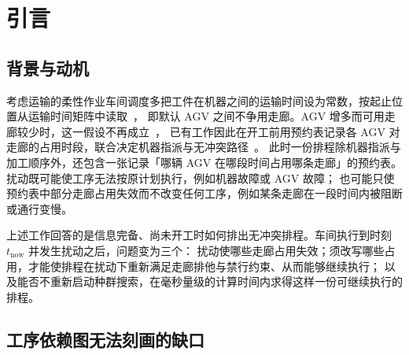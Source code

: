 \documentclass[manuscript,screen,review]{acmart}
\begin{document}


\maketitle

\section{引言}
\label{sec:introduction}

\subsection{背景与动机}

考虑运输的柔性作业车间调度多把工件在机器之间的运输时间设为常数，按起止位置从运输时间矩阵中读取~\cite{xin2025review,meng2025cp,qin2026knowledge}，
即默认 AGV 之间不争用走廊。AGV 增多而可用走廊较少时，这一假设不再成立~\cite{kim2026congestion}，
已有工作因此在开工前用预约表记录各 AGV 对走廊的占用时段，联合决定机器指派与无冲突路径~\cite{vanos2026exact,sun2023integrated,lyu2019approach,li2026framework}。
此时一份排程除机器指派与加工顺序外，还包含一张记录「哪辆 AGV 在哪段时间占用哪条走廊」的预约表。
扰动既可能使工序无法按原计划执行，例如机器故障或 AGV 故障；
也可能只使预约表中部分走廊占用失效而不改变任何工序，例如某条走廊在一段时间内被阻断或通行变慢。

上述工作回答的是信息完备、尚未开工时如何排出无冲突排程。车间执行到时刻 \(t_{\mathrm{now}}\) 并发生扰动之后，问题变为三个：
扰动使哪些走廊占用失效；须改写哪些占用，才能使排程在扰动下重新满足走廊排他与禁行约束、从而能够继续执行；
以及能否不重新启动种群搜索，在毫秒量级的计算时间内求得这样一份可继续执行的排程。

\subsection{工序依赖图无法刻画的缺口}
\end{document}
